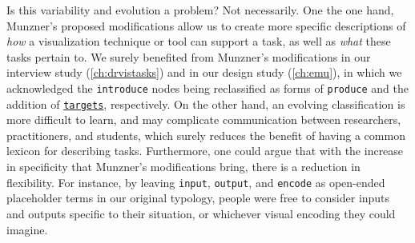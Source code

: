 Is this variability and evolution a problem? 
Not necessarily. 
One the one hand, Munzner's proposed modifications allow us to create more specific descriptions of {\it how} a visualization technique or tool can support a task, as well as {\it what} these tasks pertain to.
We surely benefited from Munzner's modifications in our interview study (\autoref{ch:drvistasks}) and in our design study (\autoref{ch:emu}), in which we acknowledged the {\tt introduce} nodes being reclassified as forms of {\tt produce} and the addition of \underline{{\tt targets}}, respectively.
On the other hand, an evolving classification is more difficult to learn, and may complicate communication between researchers, practitioners, and students, which surely reduces the benefit of having a common lexicon for describing tasks. 
Furthermore, one could argue that with the increase in specificity that Munzner's modifications bring, there is a reduction in flexibility. 
For instance, by leaving {\tt input}, {\tt output}, and {\tt encode} as open-ended placeholder terms in our original typology, people were free to consider inputs and outputs specific to their situation, or whichever visual encoding they could imagine.

